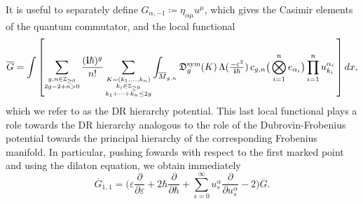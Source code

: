 \documentclass{amsart}
\numberwithin{equation}{section} %
\theoremstyle{plain}
\theoremstyle{remark}
\def\cxi{\mathbf{i}}
\begin{document}
It is useful to separately define $G_{\alpha,-1} \coloneqq \eta_{\alpha\mu}u^{\mu}$, which gives the Casimir elements of the quantum commutator, and the local functional
\begin{align}\label{eq:DR potential}
\overline{G} = \int \left[ \sum _{\footnotesize\substack{g,n\in \mathbb{Z}_{\geq 0} \\ 2g-2+n>0}} \frac{(\cxi\hbar)^{g}}{n!} \sum_{\footnotesize\substack{K=(k_1,\dots,k_n) \\ k_i \in \mathbb{Z}_{\geq 0} \\ k_1+\cdots+k_n\leq 2g}} 
\int_{\overline{M}_{g,n}} \mathfrak{D}^{\mathrm{sym}}_{g}(K) \, \Lambda( \tfrac{-\varepsilon^2}{\cxi\hbar}) \, c_{g,n}\big(\bigotimes_{i=1}^n e_{\alpha_i} \big)  \prod_{i=1}^n u^{\alpha_i}_{k_i} \, \right]dx,
\end{align}
which we refer to as the DR hierarchy potential. This last local functional plays a role towards the DR hierarchy analogous to the role of the Dubrovin-Frobenius potential towards the principal hierarchy of the corresponding Frobenius manifold. In particular, pushing fowards with respect to the first marked point and using the dilaton equation, we obtain immediately
\begin{equation}\label{eq: dilaton}
\overline{G}_{1,1} = \Big( \varepsilon \frac{\partial}{\partial \varepsilon} + 2\hbar \frac{\partial}{\partial \hbar} + \sum_{s=0}^\infty u^{\alpha}_s \frac{\partial}{\partial u^{\alpha}_s}-2\Big) \overline{G}.
\end{equation}
\end{document}

